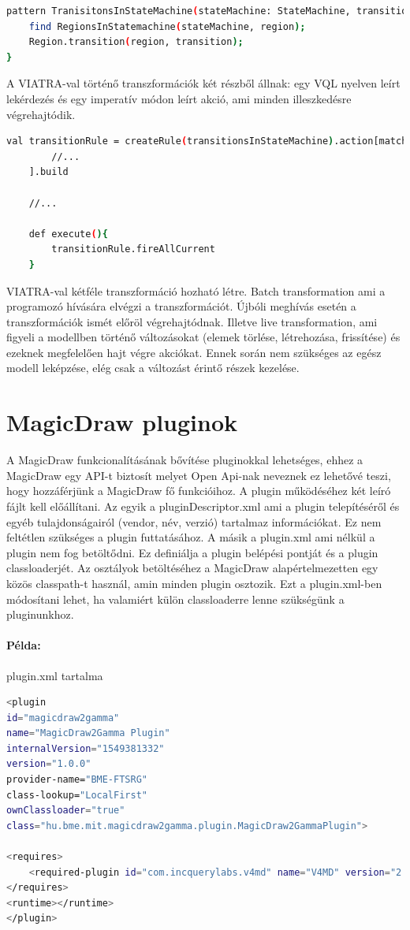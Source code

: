 \begin{lstlisting}[language=bash,frame=single,float=!ht]
pattern TranisitonsInStateMachine(stateMachine: StateMachine, transition: Transition){
	find RegionsInStatemachine(stateMachine, region);
	Region.transition(region, transition);
}
\end{lstlisting}

A VIATRA-val történő transzformációk két részből állnak: egy VQL nyelven leírt lekérdezés és egy imperatív módon leírt akció, ami minden illeszkedésre végrehajtódik.

\begin{lstlisting}[language=bash,frame=single,float=!ht]
	val transitionRule = createRule(transitionsInStateMachine).action[match | 
		//...
	].build
	
	//...
	
	def execute(){
		transitionRule.fireAllCurrent
	}
\end{lstlisting}

VIATRA-val kétféle transzformáció hozható létre. Batch transformation ami a programozó hívására elvégzi a transzformációt. Újbóli meghívás esetén a transzformációk ismét előröl végrehajtódnak. Illetve live transformation, ami figyeli a modellben történő változásokat (elemek törlése, létrehozása, frissítése) és ezeknek megfelelően hajt végre akciókat. Ennek során nem szükséges az egész modell leképzése, elég csak a változást érintő részek kezelése.


\section{MagicDraw pluginok}

A MagicDraw funkcionalításának bővítése pluginokkal lehetséges, ehhez a MagicDraw egy API-t biztosít melyet Open Api-nak neveznek ez lehetővé teszi, hogy hozzáférjünk a MagicDraw fő funkcióihoz. A plugin működéséhez két leíró fájlt kell előállítani. Az egyik a pluginDescriptor.xml ami a plugin telepítéséről és egyéb tulajdonságairól (vendor, név, verzió) tartalmaz információkat. Ez nem feltétlen szükséges a plugin futtatásához. A másik a plugin.xml ami nélkül a plugin nem fog betöltődni. Ez definiálja a plugin belépési pontját és a plugin classloaderjét. Az osztályok betöltéséhez a MagicDraw alapértelmezetten egy közös classpath-t használ, amin minden plugin osztozik. Ezt a plugin.xml-ben módosítani lehet, ha valamiért külön classloaderre lenne szükségünk a pluginunkhoz.

\paragraph{Példa:} plugin.xml tartalma
\begin{lstlisting}[language=bash,frame=single,float=!ht]
<plugin
id="magicdraw2gamma"
name="MagicDraw2Gamma Plugin"
internalVersion="1549381332"
version="1.0.0"
provider-name="BME-FTSRG"
class-lookup="LocalFirst"
ownClassloader="true"
class="hu.bme.mit.magicdraw2gamma.plugin.MagicDraw2GammaPlugin">

<requires>
	<required-plugin id="com.incquerylabs.v4md" name="V4MD" version="2.0.1" internalVersion="200003"/>
</requires>
<runtime></runtime>
</plugin>
\end{lstlisting}


